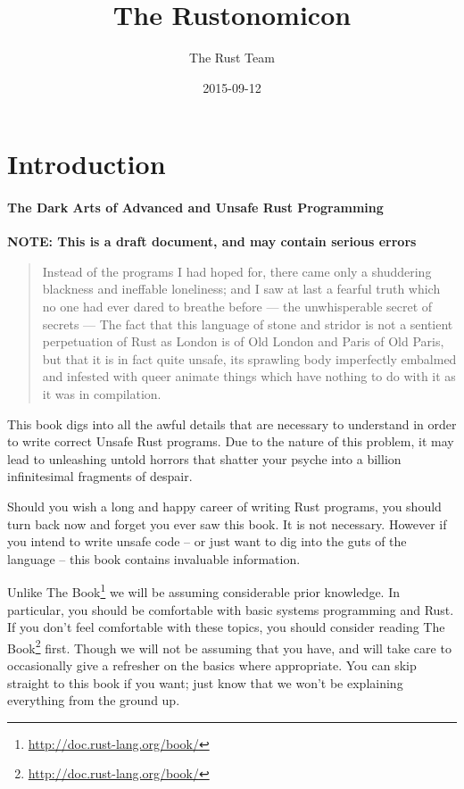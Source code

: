 \documentclass[a4paper,]{book}
\title{The Rustonomicon}
\author{The Rust Team}
\date{2015-09-12}
\renewcommand{\href}[2]{#2\footnote{\url{#1}}}
\begin{document}
  \maketitle



{
  \hypersetup{linkcolor=black}
  \setcounter{tocdepth}{2}
  \tableofcontents
  \newpage
}

\chapter{Introduction}\label{introduction}

\subsubsection{The Dark Arts of Advanced and Unsafe Rust
Programming}\label{the-dark-arts-of-advanced-and-unsafe-rust-programming}

\textbf{NOTE: This is a draft document, and may contain serious errors}

\begin{quote}
Instead of the programs I had hoped for, there came only a shuddering
blackness and ineffable loneliness; and I saw at last a fearful truth
which no one had ever dared to breathe before --- the unwhisperable
secret of secrets --- The fact that this language of stone and stridor
is not a sentient perpetuation of Rust as London is of Old London and
Paris of Old Paris, but that it is in fact quite unsafe, its sprawling
body imperfectly embalmed and infested with queer animate things which
have nothing to do with it as it was in compilation.
\end{quote}

This book digs into all the awful details that are necessary to
understand in order to write correct Unsafe Rust programs. Due to the
nature of this problem, it may lead to unleashing untold horrors that
shatter your psyche into a billion infinitesimal fragments of despair.

Should you wish a long and happy career of writing Rust programs, you
should turn back now and forget you ever saw this book. It is not
necessary. However if you intend to write unsafe code -- or just want to
dig into the guts of the language -- this book contains invaluable
information.

Unlike \href{http://doc.rust-lang.org/book/}{The Book} we will be
assuming considerable prior knowledge. In particular, you should be
comfortable with basic systems programming and Rust. If you don't feel
comfortable with these topics, you should consider
\href{http://doc.rust-lang.org/book/}{reading The Book} first. Though we
will not be assuming that you have, and will take care to occasionally
give a refresher on the basics where appropriate. You can skip straight
to this book if you want; just know that we won't be explaining
everything from the ground up.
\end{document}

